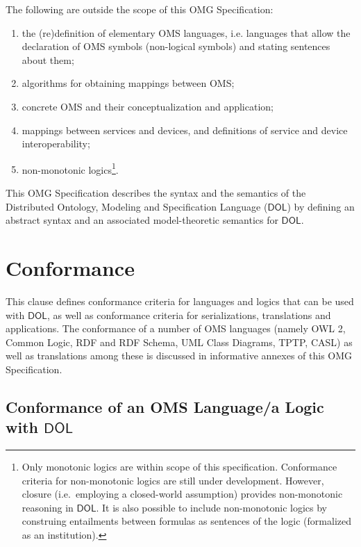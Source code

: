 \documentclass[10pt,fleqn,final]{scrreprt}
\makeatletter
\newcommand*{\ie}{i.e.\@\xspace}
\newcommand*\CommentAuthor{}
\renewcommand*\CommentAuthor{#1}}
\newcommand*\CommentDate{}
\renewcommand*\CommentDate{#1}}
\newcommand*\CommentId{}
\renewcommand*\CommentId{#1}}
\newcommand*\CommentType{}
\renewcommand*\CommentType{#1}}
\newcommand*{\SetCommentColorByType}[1]{%
\edef\localType{{#1}}%
\expandafter\ifstrequal\localType{q-aut}{\colorlet{CommentColor}{red}}{%
\expandafter\ifstrequal\localType{q-all}{\colorlet{CommentColor}{orange}}{%
\expandafter\ifstrequal\localType{todo}{\colorlet{CommentColor}{orange}}{%
\expandafter\ifstrequal\localType{fyi}{\colorlet{CommentColor}{lightgray}}{%
\colorlet{CommentColor}{yellow}}}}}}
\newcommand*{\SetCommentPrefixByType}[1]{%
\edef\localType{{#1}}%
\expandafter\@ifmtarg\localType{%
\edef\CommentPrefix{}%
}{%
\caseupper[q]{#1}%
\edef\CommentPrefix{\thestring: }%
}}
\newcommand*{\initComment}[1]{%
\setkeys{Comment}{#1}%
\SetCommentColorByType{\CommentType}%
\relax%
\SetCommentPrefixByType{\CommentType}%
\relax%
}
\newcommand*{\todonote}[2][]{%
\initComment{#1}%
\pdfcomment[author=\CommentAuthor,color=CommentColor,date=\CommentDate,id=\CommentId]{%
\CommentPrefix
#2}}
\renewcommand*{\todonote}[2][]{%
\initComment{#1}%
\ednote{\CommentPrefix #2}}
\newcommand*{\IS}{OMG Specification\xspace}
\newcommand*{\DOL}{\ensuremath{\mathsf{DOL}}\xspace}
\newcommand{\clause}[1]{\chapter{#1}}
\newcommand{\sclause}[1]{\section{#1}}
\makeatother
\begin{document}
The following are outside the scope of this \IS:
\begin{enumerate}
\item the (re)definition of elementary OMS languages, \ie languages that allow the declaration of OMS symbols (non-logical symbols) 
and
stating sentences about them;
\item algorithms for obtaining mappings between OMS;
\item concrete OMS and their conceptualization and application;
\item mappings between services and devices, and definitions of service and device interoperability;
\item non-monotonic logics\footnote{Only monotonic logics are within scope of this specification. Conformance criteria for non-monotonic logics are still under development. However, closure (i.e.\ employing a closed-world assumption) provides non-monotonic reasoning in \DOL. It is also possible to include non-monotonic logics by construing entailments between formulas as sentences of the logic (formalized as an institution).}. 

\end{enumerate}

This \IS describes the syntax and the semantics of the Distributed Ontology, Modeling and
Specification Language (\DOL) by defining an abstract syntax and an associated model-theoretic
semantics for \DOL. 


\clause{Conformance}\label{c:conformance}
This clause defines conformance criteria for languages and logics that can be used with \DOL, as well as conformance criteria for
serializations, translations and applications. The conformance of a
number of OMS languages (namely OWL 2, Common Logic, RDF and RDF Schema, UML Class Diagrams, TPTP, CASL) as well as translations among
these is discussed in informative annexes of this \IS.



\sclause{Conformance of an OMS Language/a Logic with \DOL}\label{c:conform:logic}
\end{document}
